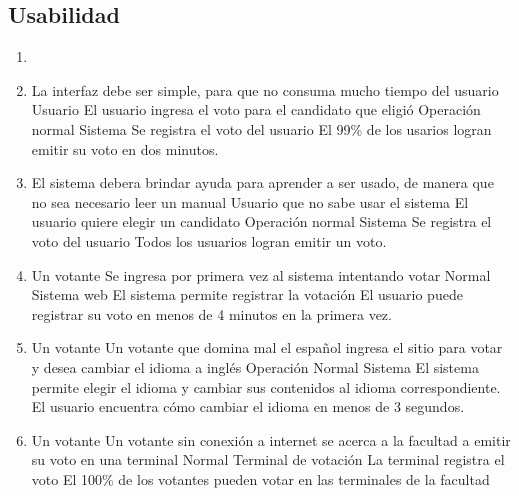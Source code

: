 \subsection{Usabilidad}

\begin{enumerate}


\item  {}

\medskip

\item  \escenario
{La interfaz debe ser simple, para que no consuma mucho tiempo del usuario}
{Usuario}
{El usuario ingresa el voto para el candidato que eligió}
{Operación normal}
{Sistema}
{Se registra el voto del usuario}
{El 99\% de los usarios logran emitir su voto en dos minutos.}
\medskip
\item  \escenario
{El sistema debera brindar ayuda para aprender a ser usado, de manera que no sea necesario leer un manual}
{Usuario que no sabe usar el sistema}
{El usuario quiere elegir un candidato}
{Operación normal}
{Sistema}
{Se registra el voto del usuario}
{Todos los usuarios logran emitir un voto.}
\medskip

\item  {}
{Un votante}
{Se ingresa por primera vez al sistema intentando votar}
{Normal}
{Sistema web}
{El sistema permite registrar la votaci\'on}
{El usuario puede registrar su voto en menos de 4 minutos en la primera vez.}

\medskip
\item   {}
{Un votante}
{Un votante que domina mal el espa\~nol ingresa el sitio para votar y desea cambiar el idioma a ingl\'es}
{Operación Normal}
{Sistema}
{El sistema permite elegir el idioma y cambiar sus contenidos al idioma correspondiente.}
{El usuario encuentra c\'omo cambiar el idioma en menos de 3 segundos.}
\medskip

\item   {}
{Un votante}
{Un votante sin conexión a internet se acerca a la facultad a emitir su voto en una terminal}
{Normal}
{Terminal de votaci\'on}
{La terminal registra el voto}
{El 100\% de los votantes pueden votar en las terminales de la facultad}

\end{enumerate}
